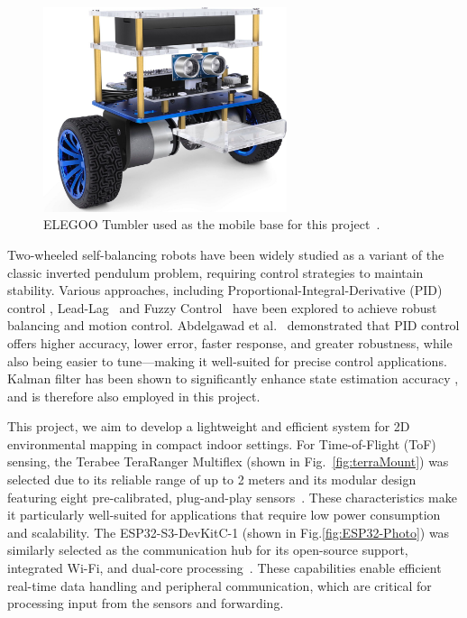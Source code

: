 \begin{figure}[h]
	\centering
	\includegraphics[height=6cm]{assets/tumbller.jpg}
	\caption{\label{fig:tumbler} ELEGOO Tumbler used as the mobile base for this project~\cite{tumbller}.}
\end{figure}

Two-wheeled self-balancing robots have been widely studied as a variant of the classic inverted pendulum problem, requiring control strategies to maintain stability. Various approaches, including Proportional-Integral-Derivative (PID) control \cite{matlab_inverted_pendulum}, Lead-Lag~\cite{nise2020control} and Fuzzy Control~\cite{passino1998fuzzy} have been explored to achieve robust balancing and motion control. Abdelgawad et al.~\cite{abdelgawad2024model} demonstrated that PID control offers higher accuracy, lower error, faster response, and greater robustness, while also being easier to tune—making it well-suited for precise control applications. Kalman filter \cite{kalman1960new} has been shown to significantly enhance state estimation accuracy \cite{IJRCS1674, ngo2017experimental, 7334442}, and is therefore also employed in this project. 

This project, we aim to develop a lightweight and efficient system for 2D environmental mapping in compact indoor settings. For Time-of-Flight (ToF) sensing, the Terabee TeraRanger Multiflex (shown in Fig.~\ref{fig:terraMount}) was selected due to its reliable range of up to 2 meters and its modular design featuring eight pre-calibrated, plug-and-play sensors~\cite{TeraRanger2025}. These characteristics make it particularly well-suited for applications that require low power consumption and scalability. The ESP32-S3-DevKitC-1 (shown in Fig.\ref{fig:ESP32-Photo}) was similarly selected as the communication hub for its open-source support, integrated Wi-Fi, and dual-core processing~\cite{ESP32-S3-DevKitC-1}. These capabilities enable efficient real-time data handling and peripheral communication, which are critical for processing input from the sensors and forwarding.

